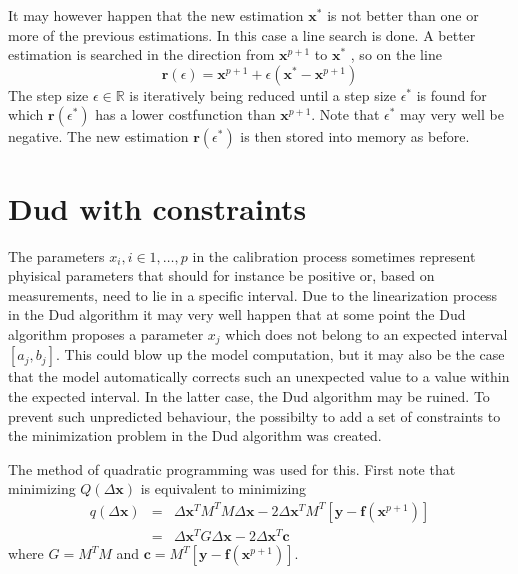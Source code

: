 It may however happen that the new estimation $\mathbf{x}^\ast$ is not better
than one or more of the previous estimations. In this case a line search is
done. A better estimation is searched in the direction from $\mathbf{x}^{p+1}$
to $\mathbf{x}^\ast$ , so on the line
\begin{equation}
\mathbf{r}(\epsilon) = \mathbf{x}^{p+1} + \epsilon (\mathbf{x}^\ast - \mathbf{x}^{p+1} )
\end{equation}
The step size $\epsilon \in \mathbb{R}$ is iteratively being reduced until a
step size $\epsilon^\ast$ is found for which $\mathbf{r}(\epsilon^\ast)$ has a
lower costfunction than $\mathbf{x}^{p+1}$. Note that $\epsilon^\ast$ may very
well be negative. The new estimation $\mathbf{r}(\epsilon^\ast)$ is then stored
into memory as before.



\section{Dud with constraints}

The parameters $x_i, i \in {1, \ldots, p}$ in the calibration process sometimes
represent phyisical parameters that should for instance be positive or, based
on measurements, need to lie in a specific interval. Due to the linearization
process in the Dud algorithm it may very well happen that at some point the Dud
algorithm proposes a parameter $x_j$ which does not belong to an expected
interval $[a_j , b_j]$. This could blow up the model computation, but it may
also be the case that the model automatically corrects such an unexpected value
to a value within the expected interval. In the latter case, the Dud algorithm
may be ruined. To prevent such unpredicted behaviour, the possibilty to add a
set of constraints to the minimization problem in the Dud algorithm was
created.

The method of quadratic programming was used for this. First note that
minimizing $Q(\Delta \mathbf{x})$ is equivalent to minimizing
\begin{eqnarray}
q(\Delta \mathbf{x}) &=& \Delta \mathbf{x}^T M^TM \Delta \mathbf{x} - 2\Delta \mathbf{x}^T M^T \left[\mathbf{y} - \mathbf{f}(\mathbf{x}^{p+1})\right]\nonumber\\
 &=& \Delta \mathbf{x}^T G\Delta \mathbf{x} - 2\Delta \mathbf{x}^T \mathbf{c}
\end{eqnarray}
where $G = M^T M$ and $\mathbf{c} = M^T \left[\mathbf{y}
- \mathbf{f}(\mathbf{x}^{p+1})\right]$.

